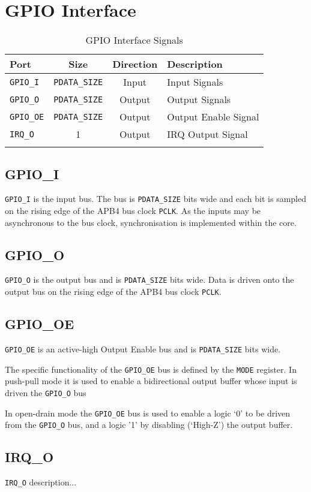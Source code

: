 \section{GPIO Interface}\label{gpio-interface}

\begin{longtable}[]{@{}lccl@{}}
\toprule
Port & Size & Direction & Description\tabularnewline
\midrule
\endhead
\texttt{GPIO\_I} & \texttt{PDATA\_SIZE} & Input & Input Signals\tabularnewline
\texttt{GPIO\_O} & \texttt{PDATA\_SIZE} & Output & Output Signals\tabularnewline
\texttt{GPIO\_OE} & \texttt{PDATA\_SIZE} & Output & Output Enable Signal\tabularnewline
\texttt{IRQ\_O} & 1 & Output & IRQ Output Signal\tabularnewline
\bottomrule
\caption{GPIO Interface Signals}
\end{longtable}

\subsection{GPIO\_I}\label{gpio_i}

\texttt{GPIO\_I} is the input bus. The bus is \texttt{PDATA\_SIZE} bits wide and each bit
is sampled on the rising edge of the APB4 bus clock \texttt{PCLK}. As the inputs
may be asynchronous to the bus clock, synchronisation is implemented
within the core.

\subsection{GPIO\_O}\label{gpio_o}

\texttt{GPIO\_O} is the output bus and is \texttt{PDATA\_SIZE} bits wide. Data is driven
onto the output bus on the rising edge of the APB4 bus clock \texttt{PCLK}.

\subsection{GPIO\_OE}\label{gpio_oe}

\texttt{GPIO\_OE} is an active-high Output Enable bus and is \texttt{PDATA\_SIZE} bits
wide.

The specific functionality of the \texttt{GPIO\_OE} bus is defined by the \texttt{MODE}
register. In push-pull mode it is used to enable a bidirectional output
buffer whose input is driven the \texttt{GPIO\_O} bus

In open-drain mode the \texttt{GPIO\_OE} bus is used to enable a logic `0' to be
driven from the \texttt{GPIO\_O} bus, and a logic '1' by disabling (`High-Z') the
output buffer.

\subsection{IRQ\_O}\label{irq_o}

\texttt{IRQ\_O} description...

